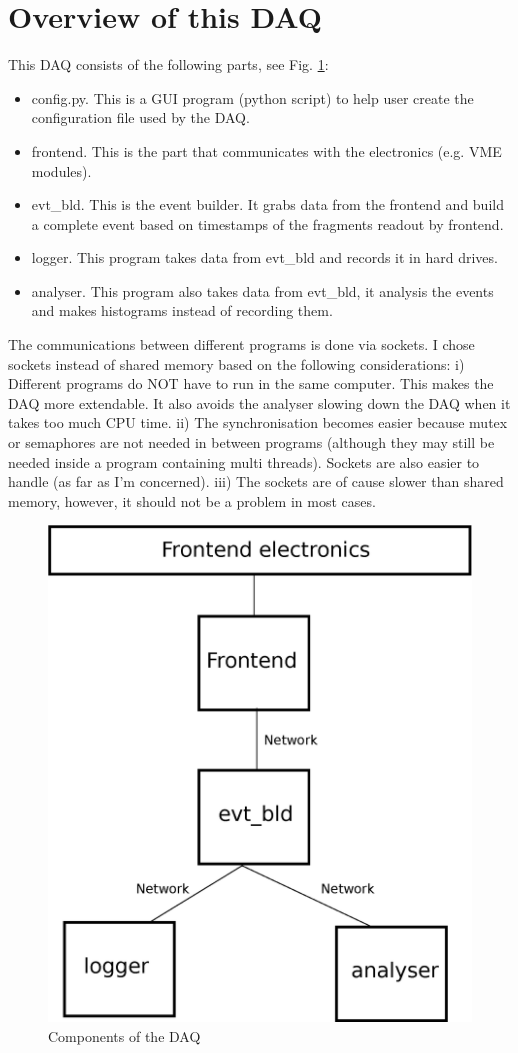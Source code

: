 \documentclass[a4paper,12pt]{article}
\begin{document}
	\section{Overview of this DAQ}
	This DAQ consists of the following parts, see Fig. \ref{fig01}:
	\begin{itemize}
		\item config.py. This is a GUI program (python script) to help user
			create the configuration file used by the DAQ.
		\item frontend. This is the part that communicates with the
			electronics (e.g. VME modules).
		\item evt\_bld. This is the event builder. It grabs data from the
			frontend and build a complete event based on timestamps of the
			fragments readout by frontend.
		\item logger. This program takes data from evt\_bld and records it
			in hard drives.
		\item analyser. This program also takes data from evt\_bld, it
			analysis the events and makes histograms instead of recording
			them.
	\end{itemize}
	The communications between different programs is done via sockets. I
	chose sockets instead of shared memory based on the following
	considerations:
	 i) Different programs do NOT have to run in the same computer. This
	 makes the DAQ more extendable. It also avoids the analyser slowing down
	 the DAQ when it takes too much CPU time.
	 ii) The synchronisation becomes easier because mutex or semaphores are
	 not needed in between programs (although they may still be needed
	 inside a program containing multi threads). Sockets are also easier to
	 handle (as far as I'm concerned).
	 iii) The sockets are of cause slower than shared memory, however, it
	 should not be a problem in most cases.
\begin{figure}
\begin{center}
\includegraphics[width=.4\textwidth]{figs/daq_scheme.eps}
    \caption{\label{fig01}Components of the DAQ }
\end{center}
\end{figure}
\end{document}
